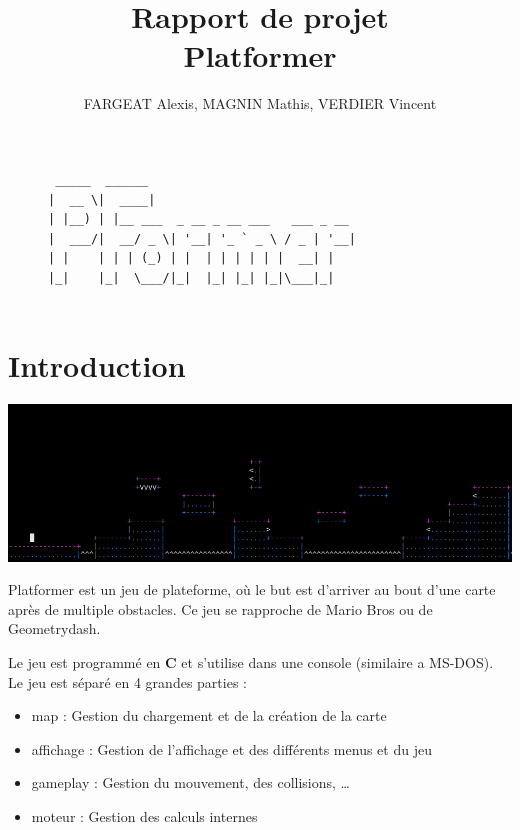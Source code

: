 \documentclass[12pt]{article}
\title{Rapport de projet\\ Platformer}
\author{\small FARGEAT Alexis, MAGNIN Mathis, VERDIER Vincent}
\begin{document}
	\maketitle

	\begin{figure}[H]
		\centering
		\begin{BVerbatim}
 _____  ______                               
|  __ \|  ____|                             
| |__) | |__ ___  _ __ _ __ ___   ___ _ __   
|  ___/|  __/ _ \| '__| '_ ` _ \ / _ | '__|
| |    | | | (_) | |  | | | | | |  __| |     
|_|    |_|  \___/|_|  |_| |_| |_|\___|_|   


		\end{BVerbatim}
	\end{figure}

	\tableofcontents
	\newpage

	\section{Introduction}
	
		\begin{center}
			\includegraphics[width = 1\textwidth]{content/image.png}
		\end{center}
	
		Platformer est un jeu de plateforme, où le but est d'arriver au bout d'une carte après de multiple obstacles.
		Ce jeu se rapproche de Mario Bros ou de Geometrydash.
	
		Le jeu est programmé en \textbf{C} et s'utilise dans une console (similaire a MS-DOS).\\

		Le jeu est séparé en 4 grandes parties :
		\begin{itemize}
			\item map : Gestion du chargement et de la création de la carte
			\item affichage : Gestion de l'affichage et des différents menus et du jeu
			\item gameplay : Gestion du mouvement, des collisions, \dots
			\item moteur : Gestion des calculs internes\\
		\end{itemize}
	
\end{document}
